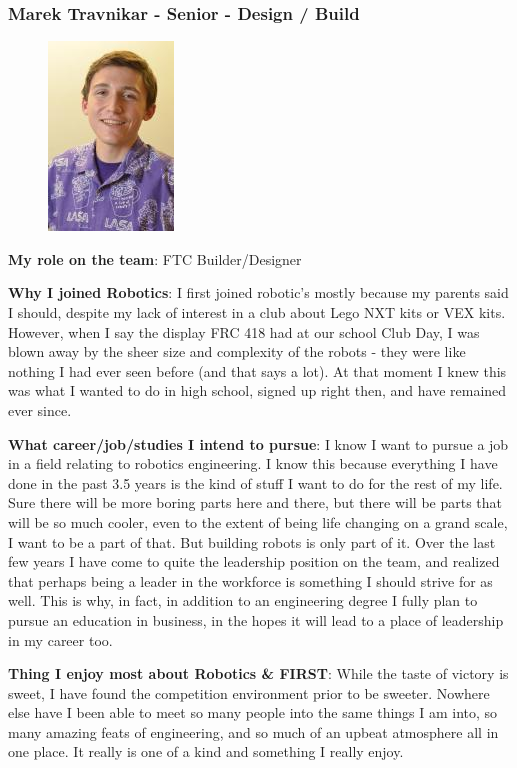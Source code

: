 \subsubsection{Marek Travnikar - Senior - Design / Build} 
\begin{figure}[H]
	\includegraphics[width=0.2\linewidth]{marek}
\end{figure}
{\bf My role on the team}: FTC Builder/Designer 

{\bf Why I joined Robotics}: I first joined robotic's mostly because my parents said I should, despite my lack of interest in a club about Lego NXT kits or VEX kits. However, when I say the display FRC 418 had at our school Club Day, I was blown away by the sheer size and complexity of the robots - they were like nothing I had ever seen before (and that says a lot). At that moment I knew this was what I wanted to do in high school, signed up right then, and have remained ever since.

{\bf What career/job/studies I intend to pursue}: I know I want to pursue a job in a field relating to robotics engineering. I know this because everything I have done in the past 3.5 years is the kind of stuff I want to do for the rest of my life. Sure there will be more boring parts here and there, but there will be parts that will be so much cooler, even to the extent of being life changing on a grand scale, I want to be a part of that.  But building robots is only part of it. Over the last few years I have come to quite the leadership position on the team, and realized that perhaps being a leader in the workforce is something I should strive for as well. This is why, in fact, in addition to an engineering degree I fully plan to pursue an education in business, in the hopes it will lead to a place of leadership in my career too.

{\bf Thing I enjoy most about Robotics \& FIRST}: While the taste of victory is sweet, I have found the competition environment prior to be sweeter. Nowhere else have I been able to meet so many people into the same things I am into, so many amazing feats of engineering, and so much of an upbeat atmosphere all in one place. It really is one of a kind and something I really enjoy. 

